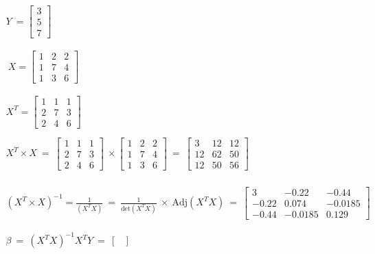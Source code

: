 \documentclass[10pt]{article}
\begin{document}
\begin{gather*}
Y\ =\begin{bmatrix}
3\\
5\\
7
\end{bmatrix}\\
\\
\\
\ X=\begin{bmatrix}
1 & 2 & 2\\
1 & 7 & 4\\
1 & 3 & 6
\end{bmatrix}\\
\\
\\
X^{T} =\begin{bmatrix}
1 & 1 & 1\\
2 & 7 & 3\\
2 & 4 & 6
\end{bmatrix}\\
\\
X^{T} \times X\ =\ \begin{bmatrix}
1 & 1 & 1\\
2 & 7 & 3\\
2 & 4 & 6
\end{bmatrix} \ \times \begin{bmatrix}
1 & 2 & 2\\
1 & 7 & 4\\
1 & 3 & 6
\end{bmatrix} \ =\ \begin{bmatrix}
3 & 12 & 12\\
12 & 62 & 50\\
12 & 50 & 56
\end{bmatrix}\\
\\
\\
\\
\left( X^{T} \times X\right)^{-1} =\frac{1}{\left( X^{T} X\right)} \ =\ \frac{1}{\text{det}\left( X^{T} X\right)} \ \times \ \text{Adj}\left( X^{T} X\right) \ =\ \begin{bmatrix}
3 & -0.22 & -0.44\\
-0.22 & 0.074 & -0.0185\\
-0.44 & -0.0185 & 0.129
\end{bmatrix}\\
\\
\\
\beta \ =\ \left( X^{T} X\right)^{-1} X^{T} Y\ =\ \begin{bmatrix}

\end{bmatrix}
\end{gather*}
\end{document}
